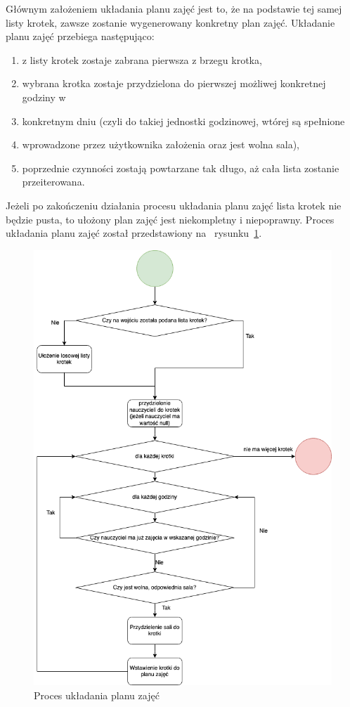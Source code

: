     Głównym założeniem układania planu zajęć jest to, że na podstawie tej samej listy krotek, zawsze zostanie wygenerowany konkretny plan zajęć. 
Układanie planu zajęć przebiega następująco:
\begin{enumerate}
	\item z listy krotek zostaje zabrana pierwsza z brzegu krotka,
	\item wybrana krotka zostaje przydzielona do pierwszej możliwej konkretnej godziny w 		\item konkretnym dniu (czyli do takiej jednostki godzinowej, wtórej są spełnione 			\item wprowadzone przez użytkownika założenia oraz jest wolna sala),
	\item poprzednie czynności zostają powtarzane tak długo, aż cała lista zostanie przeiterowana.
\end{enumerate}
Jeżeli po zakończeniu działania procesu układania planu zajęć lista krotek nie będzie pusta, to ułożony plan zajęć jest niekompletny i niepoprawny. Proces układania planu zajęć został przedstawiony na ~rysunku~\ref{rys:time_table_prep}.

\begin{figure}[h]
\centering\includegraphics[width=\textwidth]{figures/time_table_prep}
\caption{Proces układania planu zajęć}\label{rys:time_table_prep}
\end{figure}

